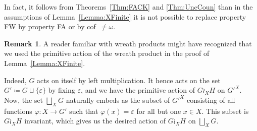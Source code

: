 \documentclass[a4paper]{article}
\theoremstyle{definition}
\newtheorem{rem}[lem]{Remark}
\begin{document}
In fact, it follows from Theorems~\ref{Thm:FACK} and \ref{Thm:UncCoun} than in the assumptions of Lemma~\ref{Lemma:XFinite} it is not possible to replace property FW by property FA or by cof~$\neq\omega$.
%
%
\begin{rem}\label{Rem:Actionsb}
A reader familiar with wreath products might have recognized that we used the primitive action of the wreath product in the proof of Lemma~\ref{Lemma:XFinite}.

Indeed, $G$ acts on itself by left multiplication.
It hence acts on the set $G'\coloneqq G\sqcup\{\varepsilon\}$ by fixing $\varepsilon$, and we have the primitive action of $G\wr_{X} H$ on $G'^X$.
Now, the set $\bigsqcup_XG$ naturally embeds as the subset of $G'^X$ consisting of all functions $\varphi\colon X\to G'$ such that $\varphi(x)=\varepsilon$ for all but one $x\in X$.
This subset is $G\wr_{X} H$ invariant, which gives us the desired action of $G\wr_{X} H$ on $\bigsqcup_XG$.
\end{rem}
\end{document}
